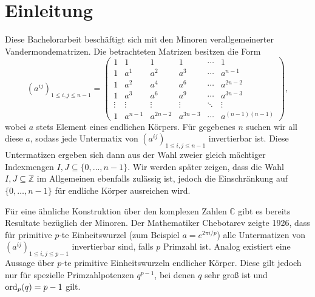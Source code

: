 \section{Einleitung}

Diese Bachelorarbeit beschäftigt sich mit den Minoren verallgemeinerter Vandermondematrizen. Die betrachteten Matrizen besitzen die Form \begin{equation*}
    \left( a^{ij} \right)_{1\leq i,j \leq n-1} = \begin{pmatrix}
        1     & 1    & 1    & 1    &\cdots& 1 \\
        1     & a^1  & a^2  & a^3  &\cdots& a^{n-1} \\
        1     & a^2  & a^4  & a^6  &\cdots& a^{2n-2} \\
        1     & a^3  & a^6  & a^9  &\cdots& a^{3n-3} \\
        \vdots&\vdots&\vdots&\vdots&\ddots&\vdots \\
        1     &a^{n-1}&a^{2n-2}&a^{3n-3}&\cdots&a^{(n-1)(n-1)}
    \end{pmatrix},
\end{equation*}
wobei $a$ stets Element eines endlichen Körpers. Für gegebenes $n$ suchen wir all diese $a$, sodass jede Untermatix von $\left( a^{ij} \right)_{1\leq i,j \leq n-1}$ invertierbar ist.
Diese Untermatizen ergeben sich dann aus der Wahl zweier gleich mächtiger Indexmengen $I,J \subseteq \{0, \dots, n-1\}$. Wir werden später zeigen, dass die Wahl $I,J \subseteq \mathbb{Z}$ im Allgemeinen ebenfalls zulässig ist, jedoch die Einschränkung auf $\{0, \dots, n-1\}$ für endliche Körper ausreichen wird. 

Für eine ähnliche Konstruktion über den komplexen Zahlen $\mathbb{C}$ gibt es bereits Resultate bezüglich der Minoren. Der Mathematiker Chebotarev zeigte 1926, dass für primitive $p$-te Einheitswurzel (zum Beispiel $a=e^{2\pi i/p}$) alle Untermatizen von $\left( a^{ij} \right)_{1\leq i,j \leq p-1}$ invertierbar sind, falls $p$ Primzahl ist. \cite{CheboProof}
Analog existiert eine Aussage über $p$-te primitive Einheitswurzeln endlicher Körper. Diese gilt jedoch nur für spezielle Primzahlpotenzen $q^{p-1}$, bei denen $q$ sehr groß ist und $\ord{q}[p] = p-1$  gilt. \cite{CheboFiniteFields}
